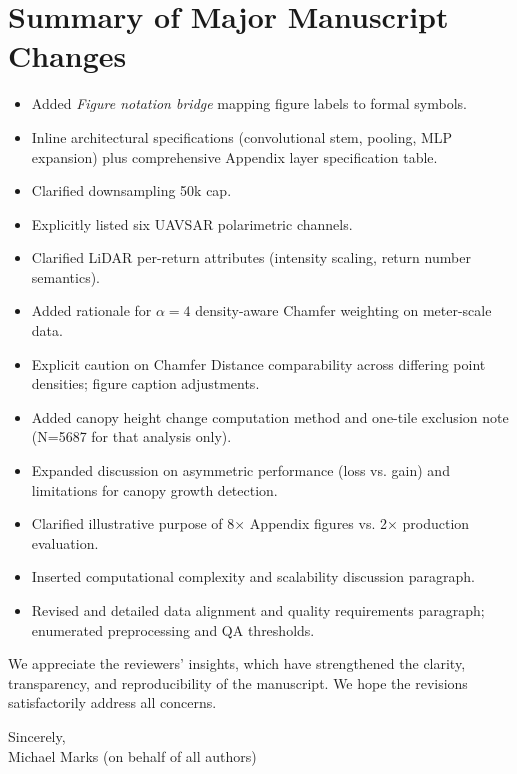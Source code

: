 \documentclass[11pt]{article}
\begin{document}
\section*{Summary of Major Manuscript Changes}
\begin{itemize}
  \item Added \emph{Figure notation bridge} mapping figure labels to formal symbols.
  \item Inline architectural specifications (convolutional stem, pooling, MLP expansion) plus comprehensive Appendix layer specification table.
  \item Clarified downsampling 50k cap.
  \item Explicitly listed six UAVSAR polarimetric channels.
  \item Clarified LiDAR per-return attributes (intensity scaling, return number semantics).
  \item Added rationale for $\alpha=4$ density-aware Chamfer weighting on meter-scale data.
  \item Explicit caution on Chamfer Distance comparability across differing point densities; figure caption adjustments.
  \item Added canopy height change computation method and one-tile exclusion note (N=5687 for that analysis only).
  \item Expanded discussion on asymmetric performance (loss vs. gain) and limitations for canopy growth detection.
  \item Clarified illustrative purpose of 8× Appendix figures vs. 2× production evaluation.
  \item Inserted computational complexity and scalability discussion paragraph.
  \item Revised and detailed data alignment and quality requirements paragraph; enumerated preprocessing and QA thresholds.
\end{itemize}

We appreciate the reviewers’ insights, which have strengthened the clarity, transparency, and reproducibility of the manuscript. We hope the revisions satisfactorily address all concerns.

\vspace{1em}
\noindent Sincerely,\\[4pt]
Michael Marks (on behalf of all authors)
\end{document}
